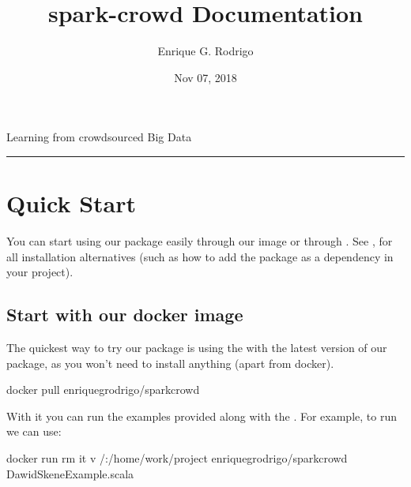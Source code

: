 \documentclass[letterpaper,10pt,english]{sphinxmanual}
\title{spark-crowd Documentation}
\date{Nov 07, 2018}
\author{Enrique G. Rodrigo}
\begin{document}
\pagestyle{empty}
\maketitle
\pagestyle{plain}
\sphinxtableofcontents
\pagestyle{normal}
\label{\detokenize{index::doc}}


Learning from crowdsourced Big Data


\bigskip\hrule\bigskip



\chapter{Quick Start}
\label{\detokenize{usage/quickstart:quick-start}}\label{\detokenize{usage/quickstart:quickstart}}\label{\detokenize{usage/quickstart::doc}}
You can start using our package easily through our  image or through .
See {\hyperref[\detokenize{usage/installation:installation}]{}}, for all installation alternatives (such as how to add the package as a dependency in your project).


\section{Start with our docker image}
\label{\detokenize{usage/quickstart:start-with-our-docker-image}}
The quickest way to try our package is using the
 with the latest version of
our package, as you won’t need to install anything (apart from docker).

%
\begin{sphinxVerbatim}[commandchars=\\\{\}]
docker pull enriquegrodrigo/spark\PYGZhy{}crowd
\end{sphinxVerbatim}

With it you can run the examples provided along with the
. For example,
to run  we can use:

%
\begin{sphinxVerbatim}[commandchars=\\\{\}]
docker run \PYGZhy{}\PYGZhy{}rm \PYGZhy{}it \PYGZhy{}v /:/home/work/project enriquegrodrigo/spark\PYGZhy{}crowd DawidSkeneExample.scala
\end{sphinxVerbatim}
\end{document}
